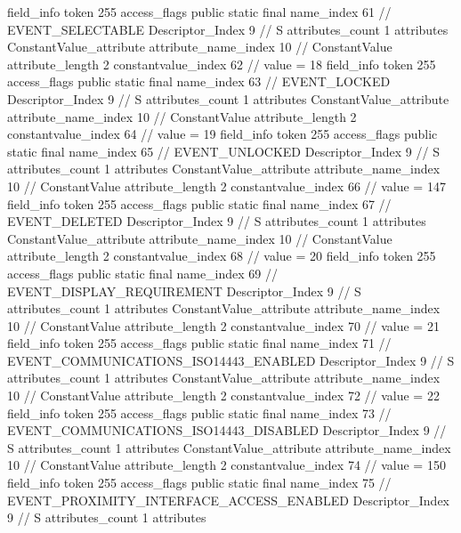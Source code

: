 {{{{{{{				}
				}
			}
			field_info {
				token	255
				access_flags	public static final
				name_index	61		// EVENT_SELECTABLE
				Descriptor_Index	9		// S
				attributes_count	1
				attributes {
				ConstantValue_attribute {
					attribute_name_index	10		// ConstantValue
					attribute_length	2
					constantvalue_index	62		// value = 18
				}
				}
			}
			field_info {
				token	255
				access_flags	public static final
				name_index	63		// EVENT_LOCKED
				Descriptor_Index	9		// S
				attributes_count	1
				attributes {
				ConstantValue_attribute {
					attribute_name_index	10		// ConstantValue
					attribute_length	2
					constantvalue_index	64		// value = 19
				}
				}
			}
			field_info {
				token	255
				access_flags	public static final
				name_index	65		// EVENT_UNLOCKED
				Descriptor_Index	9		// S
				attributes_count	1
				attributes {
				ConstantValue_attribute {
					attribute_name_index	10		// ConstantValue
					attribute_length	2
					constantvalue_index	66		// value = 147
				}
				}
			}
			field_info {
				token	255
				access_flags	public static final
				name_index	67		// EVENT_DELETED
				Descriptor_Index	9		// S
				attributes_count	1
				attributes {
				ConstantValue_attribute {
					attribute_name_index	10		// ConstantValue
					attribute_length	2
					constantvalue_index	68		// value = 20
				}
				}
			}
			field_info {
				token	255
				access_flags	public static final
				name_index	69		// EVENT_DISPLAY_REQUIREMENT
				Descriptor_Index	9		// S
				attributes_count	1
				attributes {
				ConstantValue_attribute {
					attribute_name_index	10		// ConstantValue
					attribute_length	2
					constantvalue_index	70		// value = 21
				}
				}
			}
			field_info {
				token	255
				access_flags	public static final
				name_index	71		// EVENT_COMMUNICATIONS_ISO14443_ENABLED
				Descriptor_Index	9		// S
				attributes_count	1
				attributes {
				ConstantValue_attribute {
					attribute_name_index	10		// ConstantValue
					attribute_length	2
					constantvalue_index	72		// value = 22
				}
				}
			}
			field_info {
				token	255
				access_flags	public static final
				name_index	73		// EVENT_COMMUNICATIONS_ISO14443_DISABLED
				Descriptor_Index	9		// S
				attributes_count	1
				attributes {
				ConstantValue_attribute {
					attribute_name_index	10		// ConstantValue
					attribute_length	2
					constantvalue_index	74		// value = 150
				}
				}
			}
			field_info {
				token	255
				access_flags	public static final
				name_index	75		// EVENT_PROXIMITY_INTERFACE_ACCESS_ENABLED
				Descriptor_Index	9		// S
				attributes_count	1
				attributes {
}}}}}}
